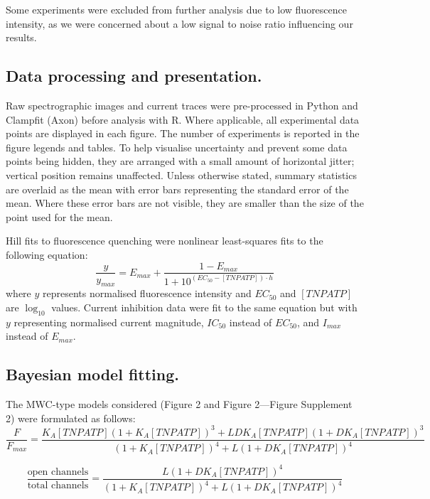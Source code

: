 \documentclass[10pt,lineno, doublespacing]{elife}
\begin{document}
Some experiments were excluded from further analysis due to low fluorescence intensity, as we were concerned about a low signal to noise ratio influencing our results.

\subsection{Data processing and presentation.}
Raw spectrographic images and current traces were pre-processed in Python and Clampfit (Axon) before analysis with R.
Where applicable, all experimental data points are displayed in each figure.
The number of experiments is reported in the figure legends and tables.
To help visualise uncertainty and prevent some data points being hidden, they are arranged with a small amount of horizontal jitter; vertical position remains unaffected.
Unless otherwise stated, summary statistics are overlaid as the mean with error bars representing the standard error of the mean.
Where these error bars are not visible, they are smaller than the size of the point used for the mean.

Hill fits to fluorescence quenching were nonlinear least-squares fits to the following equation:
\begin{equation} \label{eq:hill}
    \frac{y}{y_{max}} = E_{max} + \frac{1 - E_{max}}{1 + 10^{(EC_{50} - [TNPATP]) \cdot h}}
\end{equation}
where $y$ represents normalised fluorescence intensity and $EC_{50}$ and $[TNPATP]$ are $\log_{10}$ values.
Current inhibition data were fit to the same equation but with $y$ representing normalised current magnitude, $IC_{50}$ instead of $EC_{50}$, and $I_{max}$ instead of $E_{max}$.

\subsection{Bayesian model fitting.}
The MWC-type models considered (Figure 2 and Figure 2—Figure Supplement 2) were formulated as follows:
\begin{equation} \label{eq:binding}
\frac{F}{F_{max}} = \frac
    {K_A[TNPATP](1+K_A[TNPATP])^3+LDK_A[TNPATP](1+DK_A[TNPATP])^3}
    {(1+K_A[TNPATP])^4+L(1+DK_A[TNPATP])^4}
\end{equation}

\begin{equation} \label{eq:gating}
\frac{\text{open channels}}{\text{total channels}} = \frac
    {L(1+DK_A[TNPATP])^4}
    {(1+K_A[TNPATP])^4+L(1+DK_A[TNPATP])^4}
\end{equation}
\end{document}
